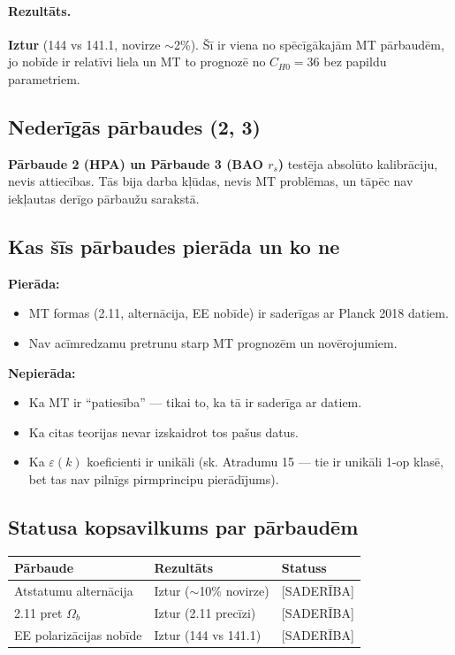 \documentclass[12pt,a4paper]{article}
\begin{document}
\paragraph{Rezultāts.}
\textbf{Iztur} (144 vs 141.1, novirze $\sim$2\%). Šī ir viena no spēcīgākajām MT pārbaudēm, jo nobīde ir relatīvi liela un MT to prognozē no $C_{H0} = 36$ bez papildu parametriem.

\subsection*{Nederīgās pārbaudes (2, 3)}

\textbf{Pārbaude 2 (HPA) un Pārbaude 3 (BAO $r_s$)} testēja absolūto kalibrāciju, nevis attiecības. Tās bija darba kļūdas, nevis MT problēmas, un tāpēc nav iekļautas derīgo pārbaužu sarakstā.

\subsection*{Kas šīs pārbaudes pierāda un ko ne}

\textbf{Pierāda:}
\begin{itemize}
    \item MT formas (2.11, alternācija, EE nobīde) ir saderīgas ar Planck 2018 datiem.
    \item Nav acīmredzamu pretrunu starp MT prognozēm un novērojumiem.
\end{itemize}

\textbf{Nepierāda:}
\begin{itemize}
    \item Ka MT ir ``patiesība'' — tikai to, ka tā ir saderīga ar datiem.
    \item Ka citas teorijas nevar izskaidrot tos pašus datus.
    \item Ka $\varepsilon(k)$ koeficienti ir unikāli (sk. Atradumu 15 — tie ir unikāli 1-op klasē, bet tas nav pilnīgs pirmprincipu pierādījums).
\end{itemize}

\subsection*{Statusa kopsavilkums par pārbaudēm}

\begin{table}[h]
\centering
\begin{tabular}{|l|l|l|}
\hline
\textbf{Pārbaude} & \textbf{Rezultāts} & \textbf{Statuss} \\
\hline
Atstatumu alternācija & Iztur ($\sim$10\% novirze) & [SADERĪBA] \\
2.11 pret $\Omega_b$ & Iztur (2.11 precīzi) & [SADERĪBA] \\
EE polarizācijas nobīde & Iztur (144 vs 141.1) & [SADERĪBA] \\
\hline
\end{tabular}
\end{table}
\end{document}
